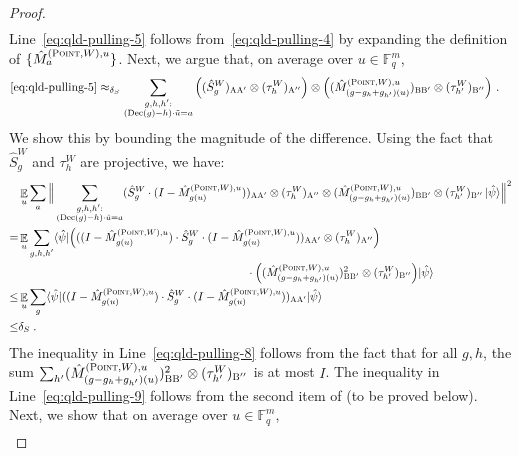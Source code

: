 \documentclass[11pt]{article}
\theoremstyle{definition}
\newcommand{\ket}[1]{|#1\rangle}
\newcommand{\bra}[1]{\langle#1|}
\newcommand{\Id}{\ensuremath{I}}
\newcommand{\F}{\ensuremath{\mathbb{F}}}
\newcommand{\E}{\mathop{\mathbb{E}}\displaylimits}
\newcommand{\labelstyle}[1]{\ensuremath{\textsc{#1}}\xspace}
\newcommand{\alice}{\labelstyle{A}}
\newcommand{\bob}{\labelstyle{B}}
\newcommand{\typestyle}[1]{\ensuremath{\textsc{#1}}\xspace}
\newcommand{\Point}{\typestyle{Point}}
\newcommand{\coded}{\mathrm{Dec}}
\begin{document}
\begin{proof}
\begin{align}
\end{align}
	Line~\eqref{eq:qld-pulling-5} follows from~\eqref{eq:qld-pulling-4} by expanding the definition of $\{ \hat{M}^{(\Point,W),u}_a\}$. Next, we argue that, on average over $u \in \F_q^m$,
\begin{align}
		\text{\eqref{eq:qld-pulling-5}} &\approx_{\delta_S} \sum_{\substack{g,h,h': \\ (\coded(g)-h)\cdot \tilde{u} = a}} \Big((\hat{S}^W_g)_{\alice \alice'} \otimes (\tau_h^W)_{\alice''} \Big) \otimes \Big( (\hat{M}^{(\Point,W),u}_{(g-g_h+g_{h'})(u)})_{\bob \bob'} \otimes (\tau_{h'}^W)_{\bob''} \Big)~. \label{eq:qld-pulling-7}
		\end{align}
		We show this by bounding the magnitude of the difference. Using the fact that $\hat{S}^W_g$ and $\tau^W_h$ are projective, we have:
		\begin{align}
		&\E_u \sum_a \Big \|\sum_{\substack{g,h,h': \\ (\coded(g)-h)\cdot \tilde{u} = a}} (\hat{S}^W_g \cdot (\Id - \hat{M}^{(\Point,W),u}_{g(u)}))_{\alice \alice'} \otimes (\tau_h^W)_{\alice''} \otimes (\hat{M}^{(\Point,W),u}_{(g-g_h+g_{h'})(u)})_{\bob \bob'} \otimes (\tau_{h'}^W)_{\bob''} \, \ket{\hat{\psi}} \Big \|^2 \notag \\
      =& \E_u \sum_{\substack{g,h,h'}} \bra{\hat{\psi}} \Big(((\Id - \hat{M}^{(\Point,W),u}_{g(u)}) \cdot \hat{S}^W_g \cdot (\Id - \hat{M}^{(\Point,W),u}_{g(u)}))_{\alice \alice'} \otimes (\tau_h^W)_{\alice''} \Big) \notag \\
      & \hspace{20em} \cdot \Big( (\hat{M}^{(\Point,W),u}_{(g-g_h+g_{h'})(u)})^2_{\bob \bob'} \otimes (\tau_{h'}^W)_{\bob''} \Big) \ket{\hat{\psi}} \notag \\
		\leq& \E_u \sum_{g} \bra{\hat{\psi}} ((\Id - \hat{M}^{(\Point,W),u}_{g(u)}) \cdot \hat{S}^W_g \cdot (\Id - \hat{M}^{(\Point,W),u}_{g(u)}))_{\alice \alice'} \ket{\hat{\psi}}\label{eq:qld-pulling-8} \\
		\leq& \delta_S\;. \label{eq:qld-pulling-9}
		\end{align}
		The inequality in Line~\eqref{eq:qld-pulling-8} follows from the fact that for all $g,h$, the sum $\sum_{h'} (\hat{M}^{(\Point,W),u}_{(g-g_h+g_{h'})(u)})^2_{\bob \bob'} \otimes (\tau_{h'}^W)_{\bob''}$ is at most $\Id$. The inequality in Line~\eqref{eq:qld-pulling-9} follows from the second item of  (to be proved below). 
		Next, we show that on average over $u \in \F_q^m$,
		\begin{align}

\end{align}
\end{proof}
\end{document}

